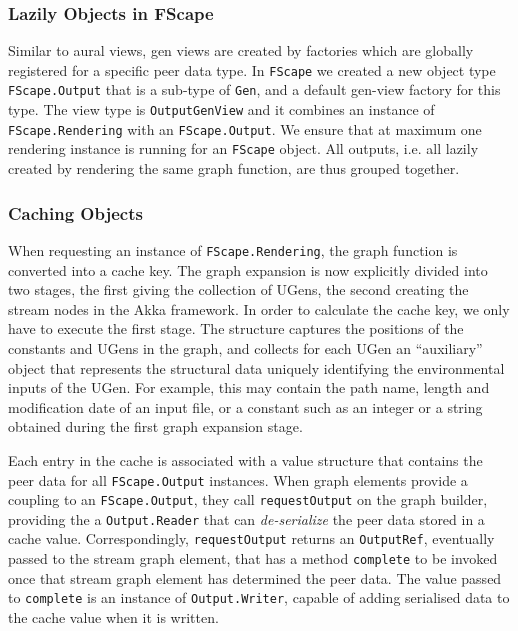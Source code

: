 \documentclass[11pt,a4paper]{article}
\begin{document}
\subsubsection{Lazily Objects in FScape}

Similar to aural views, gen views are created by factories which are globally registered for a specific peer data type. In \Verb!FScape! we created a new object type \Verb!FScape.Output! that is a sub-type of \Verb!Gen!, and a default gen-view factory for this type. The view type is \Verb!OutputGenView! and it combines an instance of \Verb!FScape.Rendering! with an \Verb!FScape.Output!. We ensure that at maximum one rendering instance is running for an \Verb!FScape! object. All outputs, i.e. all lazily created by rendering the same graph function, are thus grouped together.

\subsubsection{Caching Objects}

When requesting an instance of \Verb!FScape.Rendering!, the graph function is converted into a cache key. The graph expansion is now explicitly divided into two stages, the first giving the collection of UGens, the second creating the stream nodes in the Akka framework. In order to calculate the cache key, we only have to execute the first stage. The structure captures the positions of the constants and UGens in the graph, and collects for each UGen an ``auxiliary'' object that represents the structural data uniquely identifying the environmental inputs of the UGen. For example, this may contain the path name, length and modification date of an input file, or a constant such as an integer or a string obtained during the first graph expansion stage.

Each entry in the cache is associated with a value structure that contains the peer data for all \Verb!FScape.Output! instances. When graph elements provide a coupling to an \Verb!FScape.Output!, they call \Verb!requestOutput! on the graph builder, providing the a \Verb!Output.Reader! that can \emph{de-serialize} the peer data stored in a cache value. Correspondingly, \Verb!requestOutput! returns an \Verb!OutputRef!, eventually passed to the stream graph element, that has a method \Verb!complete! to be invoked once that stream graph element has determined the peer data. The value passed to \Verb!complete! is an instance of \Verb!Output.Writer!, capable of adding serialised data to the cache value when it is written.
\end{document}
